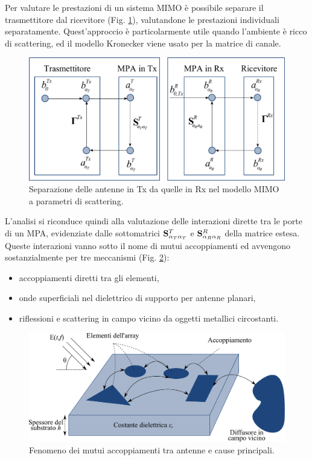 \documentclass[technote]{IEEEtran}
\begin{document}
\par Per valutare le prestazioni di un sistema MIMO è possibile separare il trasmettitore dal ricevitore (Fig. \ref{fig:15}), valutandone le prestazioni individuali separatamente. Quest'approccio è particolarmente utile quando l'ambiente è ricco di scattering, ed il modello Kronecker viene usato per la matrice di canale.
\begin{figure}[!h]
\centering
\includegraphics[width=.9\columnwidth]{figure15}
\caption{Separazione delle antenne in Tx da quelle in Rx nel modello MIMO a parametri di scattering.}
\label{fig:15}
\end{figure}
\par L'analisi si riconduce quindi alla valutazione delle interazioni dirette tra le porte di un MPA, evidenziate dalle sottomatrici ${{\bf{S}}_{{\alpha _T}{\alpha _T}}^T}$ e ${{\bf{S}}_{{\alpha _R}{\alpha _R}}^R}$ della matrice estesa. Queste interazioni vanno sotto il nome di mutui accoppiamenti ed avvengono sostanzialmente per tre meccanismi (Fig. \ref{fig:16}):
\begin{itemize}
\item accoppiamenti diretti tra gli elementi,
\item onde superficiali nel dielettrico di supporto per antenne planari,
\item riflessioni e scattering in campo vicino da oggetti metallici circostanti.
\end{itemize}
\begin{figure}[!h]
\centering
\includegraphics[width=0.9\columnwidth]{figure16}
\caption{Fenomeno dei mutui accoppiamenti tra antenne e cause principali.}
\label{fig:16} 
\end{figure} 
\end{document}
